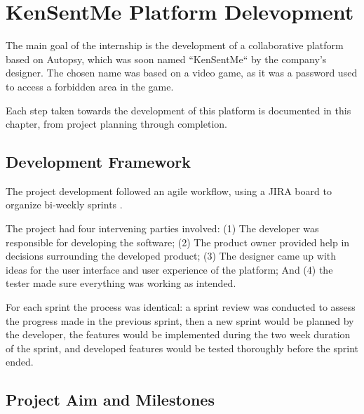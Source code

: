 
\chapter{KenSentMe Platform Delevopment}
\label{ch:development}


The main goal of the internship is the development of a collaborative platform based on Autopsy, which was soon named ``KenSentMe`` by the company's designer. 
The chosen name was based on a video game, as it was a password used to access a forbidden area in the game.

Each step taken towards the development of this platform is documented in this chapter, from project planning through completion.

\section{Development Framework}

The project development followed an agile workflow, using a JIRA \cite{jira} board to organize bi-weekly sprints \cite{sprint}.

The project had four intervening parties involved: (1) The developer was responsible for developing the software; (2) The product owner provided help in decisions surrounding the developed product; 
(3) The designer came up with ideas for the user interface and user experience of the platform; And (4) the tester made sure everything was working as intended.

For each sprint the process was identical: a sprint review was conducted to assess the progress made in the previous sprint, then a new sprint would be planned by the developer, 
the features would be implemented during the two week duration of the sprint, and developed features would be tested thoroughly before the sprint ended.

\section{Project Aim and Milestones}

